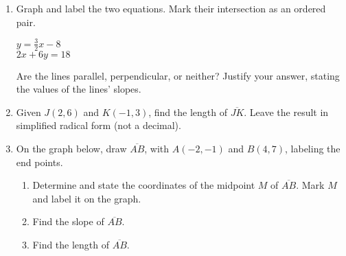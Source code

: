 \documentclass[12pt, twoside]{article}
\begin{document}
\begin{enumerate}
  \item Graph and label the two equations. Mark their intersection as an ordered pair.

    \begin{multicols}{2}
      $y = \frac{3}{2}x-8$ \\
      $2x+6y = 18$
    \end{multicols}
    \vspace{1.5cm}

      \begin{center} %
      \end{center}
    Are the lines parallel, perpendicular, or neither? Justify your answer, stating the values of the lines' slopes.


\newpage

  \item Given $J(2,6)$ and $K(-1,3)$, find the length of $\overline{JK}$. Leave the result in simplified radical form (not a decimal).
      \vspace{4cm}

  \item On the graph below, draw $\overline{AB}$, with $A(-2,-1)$ and $B(4,7)$, labeling the end points.\\
    \begin{enumerate}
      \item Determine and state the coordinates of the midpoint $M$ of $\overline{AB}$. Mark $M$ and label it on the graph. \vspace{2cm}
      \item Find the slope of $\overline{AB}$. \vspace{2.5cm}
      \item Find the length of $\overline{AB}$.
    \end{enumerate}

\newpage


\end{enumerate}
\end{document}
